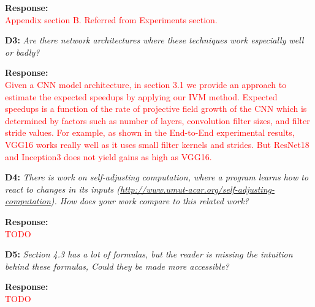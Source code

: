\documentclass[preprint]{vldb}
\newcommand{\red}{\textcolor{red}}
\begin{document}
\vspace{2mm}
\noindent \textbf{Response:}\\
\red{Appendix section B. Referred from Experiments section.}

\vspace{2mm}
\noindent \textbf{D3:} \textit{Are there network architectures where these techniques work especially well or badly?}

\vspace{2mm}
\noindent \textbf{Response:}\\
\red{Given a CNN model architecture, in section 3.1 we provide an approach to estimate the expected speedups by applying our IVM method. Expected speedups is a function of the rate of projective field growth of the CNN which is determined by factors such as number of layers, convolution filter sizes, and filter stride values. For example, as shown in the End-to-End experimental results, VGG16 works really well as it uses small filter kernels and strides. But ResNet18 and Inception3 does not yield gains as high as VGG16.}


\vspace{2mm}
\begin{sloppypar}
\noindent \textbf{D4:} \textit{There is work on self-adjusting computation, where a program learns how to react to changes in its inputs (\url{http://www.umut-acar.org/self-adjusting-computation}).
How does your work compare to this related work?}
\end{sloppypar}

\vspace{2mm}
\noindent \textbf{Response:}\\
\red{TODO}

\vspace{2mm}
\noindent \textbf{D5:} \textit{Section 4.3 has a lot of formulas, but the reader is missing the intuition behind these formulas, Could they be made more accessible?}

\vspace{2mm}
\noindent \textbf{Response:}\\
\red{TODO}
\end{document}
